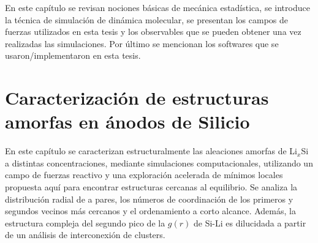 \documentclass[12pt,spanish,a4paper,twoside]{book}
\begin{document}
\vspace{50pt}

\begin{adjustwidth}{50pt}{50pt}
    En este capítulo se revisan nociones básicas de mecánica estadística, se 
    introduce la técnica de simulación de dinámica molecular, se presentan los 
    campos de fuerzas utilizados en esta tesis y los observables que se pueden 
    obtener una vez realizadas las simulaciones. Por último se mencionan los 
    softwares que se usaron/implementaron en esta tesis.
\end{adjustwidth}

\clearpage
\newpage
\thispagestyle{empty}
\mbox{}
\newpage



\chapter[Estructuras amorfas en ánodos de Silicio]{Caracterización de estructuras
amorfas en ánodos de Silicio}
\thispagestyle{empty}

\vspace{50pt}

\begin{adjustwidth}{50pt}{50pt}
    En este capítulo se caracterizan estructuralmente las aleaciones amorfas de
    Li$_x$Si a distintas concentraciones, mediante simulaciones computacionales,
    utilizando un campo de fuerzas reactivo y una exploración acelerada de mínimos
    locales propuesta aquí para encontrar estructuras cercanas al equilibrio. Se
    analiza la distribución radial de a pares, los números de coordinación de los
    primeros y segundos vecinos más cercanos y el ordenamiento a corto alcance.
    Además, la estructura compleja del segundo pico de la $g(r)$ de Si-Li es 
    dilucidada a partir de un análisis de interconexión de clusters.
\end{adjustwidth}

\clearpage
\newpage
\thispagestyle{empty}
\mbox{}
\newpage



% 



\end{document}

